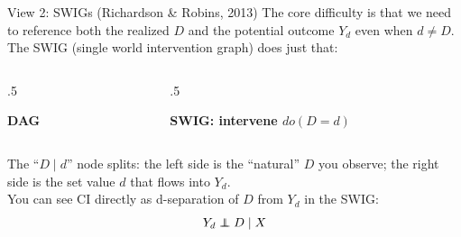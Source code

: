 \documentclass[xcolor=dvipsnames]{beamer}
\newcommand\indep{\protect\mathpalette{\protect\independenT}{\perp}}
\def\independenT#1#2{\mathrel{\rlap{$#1#2$}\mkern2mu{#1#2}}}
\begin{document}
\begin{frame}{View 2: SWIGs (Richardson \& Robins, 2013)}
\small
{} The core difficulty is that we need to reference both the realized $D$ and the potential outcome $Y_d$ even when $d \neq D$.\\
\medskip
{} The SWIG (single world intervention graph) does just that:
\begin{columns}[T]
\begin{column}{.5\textwidth}
\begin{center}
\textbf{DAG}\\[4pt]
\end{center}
\end{column}
\begin{column}{.5\textwidth}
\begin{center}
\textbf{SWIG: intervene $do(D=d)$}\\[4pt]
\end{center}
\end{column}
\end{columns}

\medskip
{} The ``$D \mid d$'' node splits: the left side is the ``natural'' $D$ you observe; the right side is the set value $d$ that flows into $Y_d$.\\[4pt]

  You can see CI directly as d-separation of $D$ from $Y_d$ in the SWIG: $$Y_d \indep D \mid X$$
\end{frame}
\end{document}
